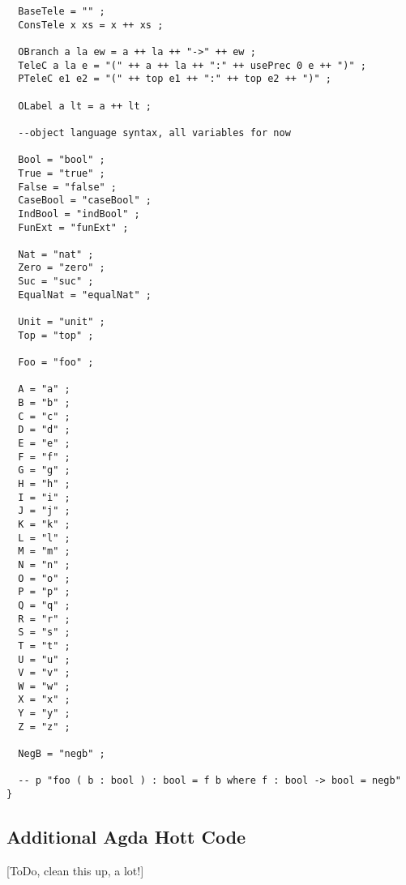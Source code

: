 \documentclass[11pt, a4paper]{article}
\begin{document}
\begin{verbatim}
  BaseTele = "" ;
  ConsTele x xs = x ++ xs ;

  OBranch a la ew = a ++ la ++ "->" ++ ew ;
  TeleC a la e = "(" ++ a ++ la ++ ":" ++ usePrec 0 e ++ ")" ;
  PTeleC e1 e2 = "(" ++ top e1 ++ ":" ++ top e2 ++ ")" ;

  OLabel a lt = a ++ lt ;

  --object language syntax, all variables for now

  Bool = "bool" ;
  True = "true" ;
  False = "false" ;
  CaseBool = "caseBool" ;
  IndBool = "indBool" ;
  FunExt = "funExt" ;

  Nat = "nat" ;
  Zero = "zero" ;
  Suc = "suc" ;
  EqualNat = "equalNat" ;

  Unit = "unit" ;
  Top = "top" ;

  Foo = "foo" ; 

  A = "a" ;
  B = "b" ;
  C = "c" ;
  D = "d" ;
  E = "e" ;
  F = "f" ;
  G = "g" ;
  H = "h" ;
  I = "i" ;
  J = "j" ;
  K = "k" ;
  L = "l" ;
  M = "m" ;
  N = "n" ;
  O = "o" ;
  P = "p" ;
  Q = "q" ;
  R = "r" ;
  S = "s" ;
  T = "t" ;
  U = "u" ;
  V = "v" ;
  W = "w" ;
  X = "x" ;
  Y = "y" ;
  Z = "z" ;

  NegB = "negb" ;

  -- p "foo ( b : bool ) : bool = f b where f : bool -> bool = negb"
}

\end{verbatim}

\subsection{Additional Agda Hott Code}

[ToDo, clean this up, a lot!]
\end{document}
